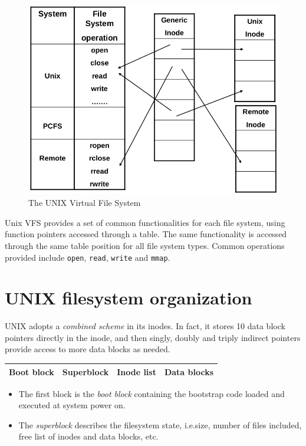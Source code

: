 \begin{figure}[hbtp]
\centering
\includegraphics[scale=0.35]{images/file_system/virtual_file_system.png}
\caption{The UNIX Virtual File System}
\end{figure}

Unix VFS provides a set of common functionalities for each file system, using function pointers
accessed through a table. The same functionality is accessed through the same table position for
all file system types. Common operations provided include \texttt{open}, \texttt{read}, \texttt{write} and \texttt{mmap}.

\section{UNIX filesystem organization}
UNIX adopts a \emph{combined scheme} in its inodes. In fact, it stores 10 data block pointers directly in the inode, and then singly, doubly and triply indirect pointers provide access to more data blocks as needed.

\begin{center}
\begin{tabular}{|c|c|c|c|}
\hline 
Boot block & Superblock & Inode list & Data blocks \\ 
\hline 
\end{tabular} 
\end{center}

\begin{itemize}
\item The first block is the \emph{boot block} containing the bootstrap code loaded and executed at system power on.
\item The \emph{superblock} describes the filesystem state, i.e.\@ size, number of files included, free list of inodes and data blocks, etc.
\end{itemize}

